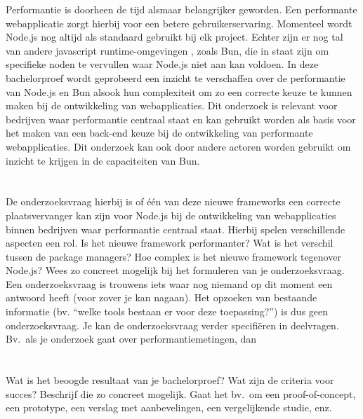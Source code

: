 Performantie is doorheen de tijd alsmaar belangrijker geworden. 
Een performante webapplicatie zorgt hierbij voor een betere gebruikerservaring. 
Momenteel wordt Node.js nog altijd als standaard gebruikt bij elk project. Echter zijn er nog tal van andere javascript runtime-omgevingen
, zoals Bun, die in staat zijn om specifieke noden te vervullen waar Node.js niet aan kan voldoen. In deze bachelorproef wordt geprobeerd 
een inzicht te verschaffen over de performantie van Node.js en Bun alsook hun complexiteit 
om zo een correcte keuze te kunnen maken bij de ontwikkeling van webapplicaties.
Dit onderzoek is relevant voor bedrijven waar performantie centraal staat en kan gebruikt worden als basis 
voor het maken van een back-end keuze bij de ontwikkeling van performante webapplicaties. Dit onderzoek kan 
ook door andere actoren worden gebruikt om inzicht te krijgen in de capaciteiten van Bun.

\section{}%
\label{sec:onderzoeksvraag}

De onderzoeksvraag hierbij is of één van deze nieuwe frameworks  
een correcte plaatsvervanger kan zijn voor Node.js bij de ontwikkeling van webapplicaties binnen bedrijven 
waar performantie centraal staat.
Hierbij spelen verschillende aspecten een rol.
Is het nieuwe framework performanter? Wat is het verschil tussen de package managers?
Hoe complex is het nieuwe framework tegenover Node.js?
Wees zo concreet mogelijk bij het formuleren van je onderzoeksvraag. 
Een onderzoeksvraag is trouwens iets waar nog niemand op dit moment een antwoord heeft (voor zover je kan nagaan). Het opzoeken van bestaande informatie (bv. ``welke tools bestaan er voor deze toepassing?'') is dus geen onderzoeksvraag. Je kan de onderzoeksvraag verder specifiëren in deelvragen. 
Bv.~als je onderzoek gaat over performantiemetingen, dan 

\section{}%
\label{sec:onderzoeksdoelstelling}

Wat is het beoogde resultaat van je bachelorproef? Wat zijn de criteria voor succes? Beschrijf die zo concreet mogelijk. Gaat het bv.\ om een proof-of-concept, een prototype, een verslag met aanbevelingen, een vergelijkende studie, enz.

